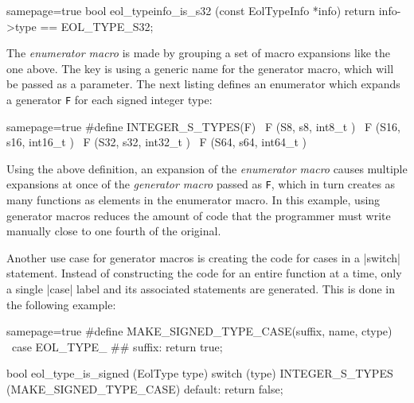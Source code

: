\begin{ccode*}{samepage=true}
  bool eol_typeinfo_is_s32 (const EolTypeInfo *info)
  { return info->type == EOL_TYPE_S32; }
\end{ccode*}

\noindent The \emph{enumerator macro} is made by grouping a set of macro
expansions like the one above. The key is using a generic name for the
generator macro, which will be passed as a parameter. The next listing defines
an enumerator which expands a generator \verb|F| for each signed integer type:

\begin{ccode*}{samepage=true}
#define INTEGER_S_TYPES(F) \
    F (S8,  s8,  int8_t  ) \
    F (S16, s16, int16_t ) \
    F (S32, s32, int32_t ) \
    F (S64, s64, int64_t )
\end{ccode*}

\noindent Using the above definition, an expansion of the \emph{enumerator
macro} causes multiple expansions at once of the \emph{generator macro} passed
as \verb|F|, which in turn creates as many functions as elements in the
enumerator macro. In this example, using generator macros reduces the amount
of code that the programmer must write manually close to one fourth of the
original.

Another use case for generator macros is creating the code for cases in
a \Mc|switch| statement. Instead of constructing the code for an entire
function at a time, only a single \Mc|case| label and its associated
statements are generated. This is done in the following example:

\begin{ccode*}{samepage=true}
#define MAKE_SIGNED_TYPE_CASE(suffix, name, ctype) \
    case EOL_TYPE_ ## suffix: return true;

bool eol_type_is_signed (EolType type) {
  switch (type) {
    INTEGER_S_TYPES (MAKE_SIGNED_TYPE_CASE)
    default: return false;
  }
}
\end{ccode*}

